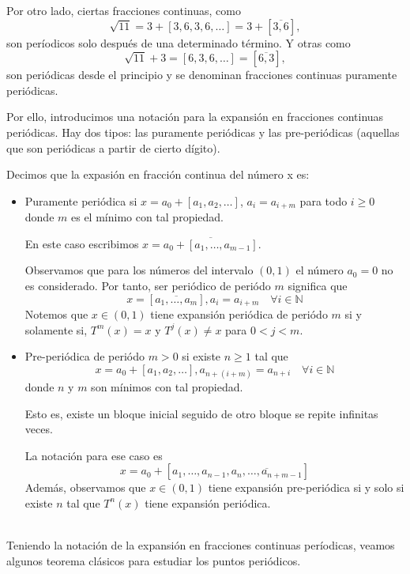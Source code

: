 Por otro lado, ciertas fracciones continuas, como
$$
\sqrt{11} = 3+[3,6,3,6,\ldots] = 3+[\overline{3,6}],
$$
son períodicos solo después de una determinado término. Y otras como
$$
\sqrt{11} +3 = [6,3,6,\ldots] = [\overline{6,3}],
$$
son periódicas desde el principio y se denominan fracciones continuas puramente periódicas.

Por ello, introducimos una notación para la expansión en fracciones continuas periódicas. Hay dos tipos: las puramente periódicas y las pre-periódicas (aquellas que son periódicas a partir de cierto dígito).

Decimos que la expasión en fracción continua del número x es:
\begin{itemize}
    \item Puramente periódica si $x=a_{0}+[a_{1},a_{2},\ldots]$, $a_{i}=a_{i+m}$ para todo $i\geq0$ donde $m$ es el mínimo con tal propiedad.
    
    En este caso escribimos $x=\overline{a_{0}+[a_{1},\ldots,a_{m-1}]}$.
    
    Observamos que para los números del intervalo $(0,1)$ el número $a_{0}=0$ no es considerado. Por tanto, ser periódico de periódo $m$ significa que
    $$
    x=[\overline{a_{1},\ldots,a_{m}}], a_{i}=a_{i+m}\quad\forall i\in\mathbb{N}
    $$
    Notemos que $x\in(0,1)$ tiene expansión periódica de periódo $m$ si y solamente si, $T^{m}(x)=x$ y $T^{j}(x)\neq x$ para $0<j<m$.
    \item Pre-periódica de periódo $m>0$ si existe $n\geq1$ tal que
    $$
    x=a_{0}+[a_{1},a_{2},\ldots], a_{n+(i+m)}=a_{n+i}\quad\forall i\in\mathbb{N}
    $$
    donde $n$ y $m$ son mínimos con tal propiedad.
    
    Esto es, existe un bloque inicial seguido de otro bloque se repite infinitas veces.
    
    La notación para ese caso es
    $$
    x=a_{0}+[a_{1},\ldots,a_{n-1},\overline{a_{n},\ldots,a_{n+m-1}}]
    $$
    Además, observamos que $x\in(0,1)$ tiene expansión pre-periódica si y solo si existe $n$ tal que $T^{n}(x)$ tiene expansión periódica.
\end{itemize}
\\
Teniendo la notación de la expansión en fracciones continuas períodicas, veamos algunos teorema clásicos para estudiar los puntos periódicos.


